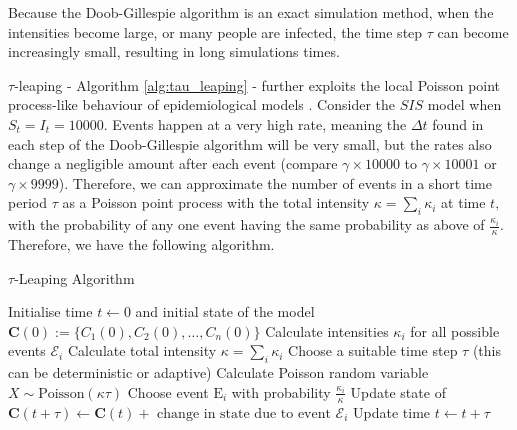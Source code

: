 Because the Doob-Gillespie algorithm is an exact simulation method, 
when the 
intensities become large, or many people are infected, the time step
$\tau$ can become increasingly small, resulting in long simulations times.

$\tau$-leaping - Algorithm \ref{alg:tau_leaping} - further exploits the 
local Poisson point process-like behaviour of
epidemiological models \parencite{gillespie_approximate_2001}. 
Consider the $SIS$ model
when $S_t = I_t = 10000.$ Events happen at a very high rate, meaning 
the $\Delta t$ found in each step of the Doob-Gillespie algorithm will be 
very small, but the rates also change a negligible amount after each event 
(compare $\gamma\times 10000$ to $\gamma\times 10001$ or $\gamma\times 9999$). 
Therefore, we can approximate the number of events in a short time period 
$\tau$ as a Poisson point process with the total intensity 
$\kappa = \sum_i \kappa_i$ at time $t,$ with the probability of any one 
event having the same probability as above of $\frac{\kappa_i}{\kappa}.$ 
Therefore, we have the following algorithm.

\begin{algorithm}
    \caption[{
        $\tau$-Leaping Algorithm
        }]{
            $\tau$-Leaping Algorithm \cite{gillespie_approximate_2001}
            }
    \label{alg:tau_leaping}
    \begin{algorithmic}
        \State Initialise time $t \gets 0$ and initial state of the model $\mathbf{C}(0) := \{C_1(0), C_2(0), \dots, C_n(0)\}$
        \State Calculate intensities $\kappa_i$ for all possible events $\mathcal{E}_i$
        \State Calculate total intensity $\kappa = \sum_i \kappa_i$
        \State Choose a suitable time step $\tau$ (this can be deterministic or adaptive)
        \State Calculate Poisson random variable $X \sim \text{Poisson}(\kappa\tau)$
        \State Choose event $\mathrm{E}_i$ with probability $\frac{\kappa_i}{\kappa}$
        \State Update state of $\mathbf{C}(t + \tau) \gets \mathbf{C}(t) + \text{ change in state due to event } \mathcal{E}_i$
        \EndFor
        \State Update time $t \gets t + \tau$
        \EndWhile
    \end{algorithmic}
\end{algorithm}

